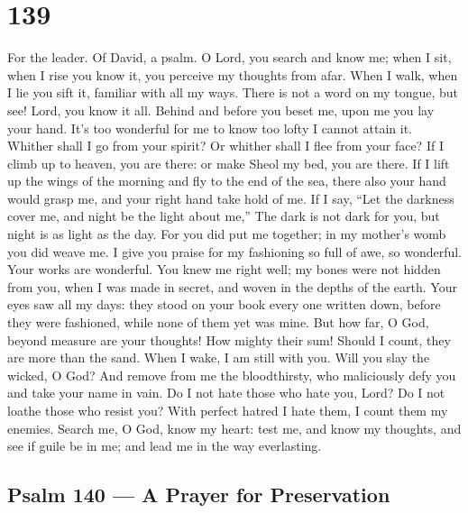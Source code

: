 \hypertarget{section-138}{%
\section{139}\label{section-138}}

For the leader. Of David, a psalm.  O Lord, you search and
know me;  when I sit, when I rise you know it, you perceive
my thoughts from afar.  When I walk, when I lie you sift it,
familiar with all my ways.  There is not a word on my
tongue, but see! Lord, you know it all.  Behind and before
you beset me, upon me you lay your hand.  It's too wonderful
for me to know too lofty I cannot attain it.  Whither shall
I go from your spirit? Or whither shall I flee from your face?
 If I climb up to heaven, you are there: or make Sheol my
bed, you are there.  If I lift up the wings of the morning
and fly to the end of the sea,  there also your hand would
grasp me, and your right hand take hold of me.  If I say,
``Let the darkness cover me, and night be the light about me,''
 The dark is not dark for you, but night is as light as the
day.  For you did put me together; in my mother's womb you
did weave me.  I give you praise for my fashioning so full
of awe, so wonderful. Your works are wonderful. You knew me right well;
 my bones were not hidden from you, when I was made in
secret, and woven in the depths of the earth.  Your eyes
saw all my days: they stood on your book every one written down, before
they were fashioned, while none of them yet was mine.  But
how far, O God, beyond measure are your thoughts! How mighty their sum!
 Should I count, they are more than the sand. When I wake,
I am still with you.  Will you slay the wicked, O God? And
remove from me the bloodthirsty,  who maliciously defy you
and take your name in vain.  Do I not hate those who hate
you, Lord? Do I not loathe those who resist you?  With
perfect hatred I hate them, I count them my enemies. 
Search me, O God, know my heart: test me, and know my thoughts,
 and see if guile be in me; and lead me in the way
everlasting.

\hypertarget{psalm-140-a-prayer-for-preservation}{%
\subsection{Psalm 140 --- A Prayer for
Preservation}\label{psalm-140-a-prayer-for-preservation}}

